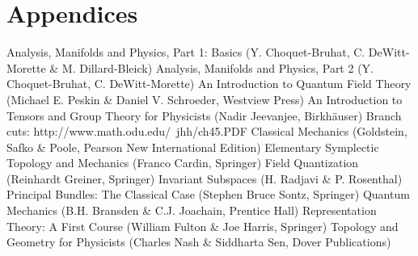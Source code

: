 \documentclass[12pt]{report}
\begin{document}
\part{Appendices}
\begin{appendices}



\end{appendices}

\begin{thebibliography}{99}
	Analysis, Manifolds and Physics, Part 1: Basics (Y. Choquet-Bruhat, C. DeWitt-Morette \& M. Dillard-Bleick)
	Analysis, Manifolds and Physics, Part 2 (Y. Choquet-Bruhat, C. DeWitt-Morette)
	An Introduction to Quantum Field Theory (Michael E. Peskin \& Daniel V. Schroeder, Westview Press)
    	An Introduction to Tensors and Group Theory for Physicists (Nadir Jeevanjee, Birkh\"auser)
    	Branch cuts: http://www.math.odu.edu/~jhh/ch45.PDF
	Classical Mechanics (Goldstein, Safko \& Poole, Pearson New International Edition)
	Elementary Symplectic Topology and Mechanics (Franco Cardin, Springer)
	Field Quantization (Reinhardt Greiner, Springer)
	Invariant Subspaces (H. Radjavi \& P. Rosenthal)
	Principal Bundles: The Classical Case (Stephen Bruce Sontz, Springer)
    	Quantum Mechanics (B.H. Bransden \& C.J. Joachain, Prentice Hall)
	Representation Theory: A First Course (William Fulton \& Joe Harris, Springer)
	Topology and Geometry for Physicists (Charles Nash \& Siddharta Sen, Dover Publications)
\end{thebibliography}

\printindex
\end{document}
